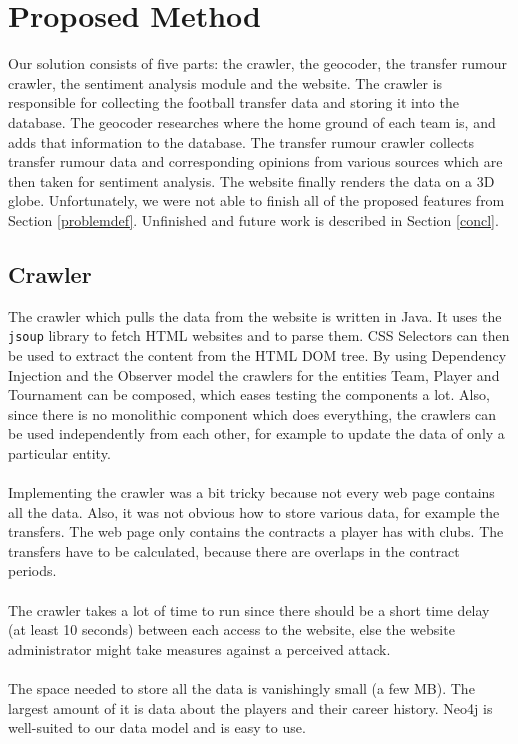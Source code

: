 \documentclass{article}
\begin{document}
\section{Proposed Method}
Our solution consists of five parts: the crawler, the geocoder, the transfer rumour crawler, the sentiment analysis module and the website. The crawler is responsible for collecting the football transfer data and storing it into the database. The geocoder researches where the home ground of each team is, and adds that information to the database. The transfer rumour crawler collects transfer rumour data and corresponding opinions from various sources which are then taken for sentiment analysis. The website finally renders the data on a 3D globe. Unfortunately, we were not able to finish all of the proposed features from Section \ref{problemdef}. Unfinished and future work is described in Section \ref{concl}.  

\subsection{Crawler}

The crawler which pulls the data from the website is written in Java. It uses the \verb+jsoup+ library \cite{jsoup} to fetch HTML websites and to parse them. CSS Selectors can then be used to extract the content from the HTML DOM tree. By using Dependency Injection and the Observer model the crawlers for the entities Team, Player and Tournament can be composed, which eases testing the components a lot. Also, since there is no monolithic component which does everything, the crawlers can be used independently from each other, for example to update the data of only a particular entity. 
\\ \\
Implementing the crawler was a bit tricky because not every web page contains all the data. Also, it was not obvious how to store various data, for example the transfers. The web page only contains the contracts a player has with clubs. The transfers have to be calculated, because there are overlaps in the contract periods. 
\\ \\
The crawler takes a lot of time to run since there should be a short time delay (at least 10 seconds) between each access to the website, else the website administrator might take measures against a perceived attack.
\\ \\
The space needed to store all the data is vanishingly small (a few MB). The largest amount of it is data about the players and their career history. Neo4j is well-suited to our data model and is easy to use. 
\end{document}
